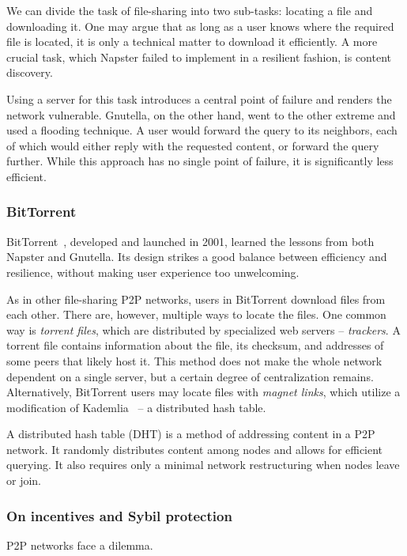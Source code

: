 We can divide the task of file-sharing into two sub-tasks: locating a file and downloading it.
One may argue that as long as a user knows where the required file is located, it is only a technical matter to download it efficiently.
A more crucial task, which Napster failed to implement in a resilient fashion, is content discovery.

Using a server for this task introduces a central point of failure and renders the network vulnerable.
Gnutella, on the other hand, went to the other extreme and used a flooding technique.
A user would forward the query to its neighbors, each of which would either reply with the requested content, or forward the query further.
While this approach has no single point of failure, it is significantly less efficient.


\subsubsection*{BitTorrent}

BitTorrent~\cite{Pouwelse2005}, developed and launched in 2001, learned the lessons from both Napster and Gnutella.
Its design strikes a good balance between efficiency and resilience, without making user experience too unwelcoming.

As in other file-sharing P2P networks, users in BitTorrent download files from each other.
There are, however, multiple ways to locate the files.
One common way is \textit{torrent files}, which are distributed by specialized web servers -- \textit{trackers}.
A torrent file contains information about the file, its checksum, and addresses of some peers that likely host it.
This method does not make the whole network dependent on a single server, but a certain degree of centralization remains.
Alternatively, BitTorrent users may locate files with \textit{magnet links}, which utilize a modification of Kademlia~\cite{Maymounkov2002} -- a distributed hash table.

A distributed hash table (DHT) is a method of addressing content in a P2P network.
It randomly distributes content among nodes and allows for efficient querying.
It also requires only a minimal network restructuring when nodes leave or join.


\subsubsection*{On incentives and Sybil protection}

P2P networks face a dilemma.

